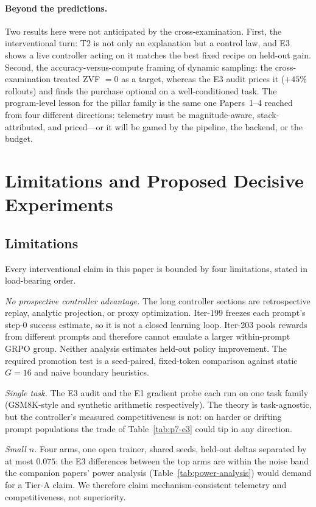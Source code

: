 \documentclass{article}
\begin{document}
\paragraph{Beyond the predictions.} Two results here were not anticipated
by the cross-examination. First, the interventional turn: T2 is not only an
explanation but a control law, and E3 shows a live controller acting on it
matches the best fixed recipe on held-out gain. Second, the
accuracy-versus-compute framing of dynamic sampling: the cross-examination
treated ZVF $= 0$ as a target, whereas the E3 audit prices it ($+45\%$
rollouts) and finds the purchase optional on a well-conditioned task. The
program-level lesson for the pillar family is the same one Papers~1--4
reached from four different directions: telemetry must be
magnitude-aware, stack-attributed, and priced---or it will be gamed by the
pipeline, the backend, or the budget.
 \section{Limitations and Proposed Decisive Experiments}
\label{sec:p7-limitations}

\subsection{Limitations}
\label{sec:p7-limitations-list}
Every interventional claim in this paper is bounded by four limitations,
stated in load-bearing order.

\emph{No prospective controller advantage.} The long controller sections are
retrospective replay, analytic projection, or proxy optimization. Iter-199
freezes each prompt's step-0 success estimate, so it is not a closed learning
loop. Iter-203 pools rewards from different prompts and therefore cannot emulate
a larger within-prompt GRPO group. Neither analysis estimates held-out policy
improvement. The required promotion test is a seed-paired, fixed-token comparison
against static $G{=}16$ and naive boundary heuristics.

\emph{Single task.} The E3 audit and the E1 gradient probe each run on one
task family (GSM8K-style and synthetic arithmetic respectively). The theory
is task-agnostic, but the controller's measured competitiveness is not: on
harder or drifting prompt populations the trade of
Table~\ref{tab:p7-e3} could tip in any direction.

\emph{Small $n$.} Four arms, one open trainer, shared seeds, held-out
deltas separated by at most $0.075$: the E3 differences between the top
arms are within the noise band the companion papers' power analysis
(Table~\ref{tab:power-analysis}) would demand for a Tier-A claim. We
therefore claim mechanism-consistent telemetry and competitiveness, not
superiority.
\end{document}

